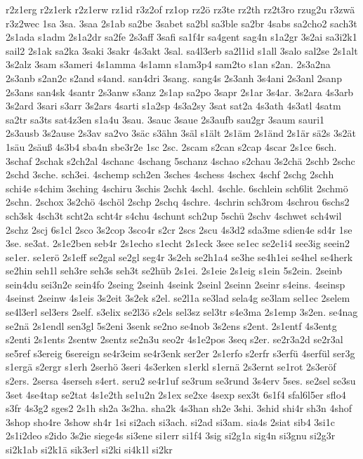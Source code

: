 {r2z1erg
r2z1erk
r2z1erw
rz1id
r3z2of
rz1op
rz2ö
rz3te
rz2th
rz2t3ro
rzug2u
r3zwä
r3z2wec
1sa
3sa.
3saa
2s1ab
sa2be
3sabet
sa2bl
sa3ble
sa2br
4sabs
sa2cho2
sach3t
2s1ada
s1adm
2s1a2dr
sa2fe
2s3aff
3safi
sa1f4r
sa4gent
sag4n
s1a2gr
3s2ai
sa3i2k1
sail2
2s1ak
sa2ka
3saki
3sakr
4s3akt
3sal.
sa4l3erb
sa2l1id
s1all
3salo
sal2se
2s1alt
3s2alz
3sam
s3ameri
4s1amma
4s1amn
s1am3p4
sam2to
s1an
s2an.
2s3a2na
2s3anb
s2an2c
s2and
s4and.
san4dri
3sang.
sang4s
2s3anh
3s4ani
2s3anl
2sanp
2s3ans
san4sk
4santr
2s3anw
s3anz
2s1ap
sa2po
3sapr
2s1ar
3s4ar.
3s2ara
4s3arb
3s2ard
3sari
s3arr
3s2ars
4sarti
s1a2sp
4s3a2sy
3sat
sat2a
4s3ath
4s3atl
4satm
sa2tr
sa3ts
sat4z3en
s1a4u
3sau.
3sauc
3saue
2s3aufb
sau2gr
3saum
sauri1
2s3ausb
3s2ause
2s3av
sa2vo
3säc
s3ähn
3säl
s1ält
2s1äm
2s1änd
2s1är
sä2s
3s2ät
1säu
2säuß
4s3b4
sba4n
sbe3r2e
1sc
2sc.
2scam
s2can
s2cap
4scar
2s1ce
6sch.
3schaf
2schak
s2ch2al
4schanc
4schang
5schanz
4schao
s2chau
3s2chä
2schb
2schc
2schd
3sche.
sch3ei.
4schemp
sch2en
3sches
4schess
4schex
4schf
2schg
2schh
schi4e
s4chim
3sching
4schiru
3schis
2schk
4schl.
4schle.
6schlein
sch6lit
2schmö
2schn.
2schox
3s2chö
4schöl
2schp
2schq
4schre.
4schrin
sch3rom
4schrou
6schs2
sch3sk
4sch3t
scht2a
scht4r
s4chu
4schunt
sch2up
5schü
2schv
4schwet
sch4wil
2schz
2scj
6s1cl
2sco
3s2cop
3sco4r
s2cr
2scs
2scu
4s3d2
sda3me
sdien4e
sd4r
1se
3se.
se3at.
2s1e2ben
seb4r
2s1echo
s1echt
2s1eck
3see
se1ec
se2e1i4
see3ig
seein2
se1er.
se1erö
2s1eff
se2gal
se2gl
seg4r
3s2eh
se2h1a4
se3he
se4h1ei
se4hel
se4herk
se2hin
seh1l
seh3re
seh3s
seh3t
se2hüb
2s1ei.
2s1eie
2s1eig
s1ein
5s2ein.
2seinb
sein4du
sei3n2e
sein4fo
2seing
2seinh
4seink
2seinl
2seinn
2seinr
s4eins.
4seinsp
4seinst
2seinw
4s1eis
3s2eit
3s2ek
s2el.
se2l1a
se3lad
sela4g
se3lam
sel1ec
2selem
se4l3erl
sel3ers
2self.
s3elix
se2l3ö
s2els
sel3sz
sel3tr
s4e3ma
2s1emp
3s2en.
se4nag
se2nä
2s1endl
sen3gl
5s2eni
3senk
se2no
se4nob
3s2ens
s2ent.
2s1entf
4s3entg
s2enti
2s1ents
2sentw
2sentz
se2n3u
seo2r
4s1e2pos
3seq
s2er.
se2r3a2d
se2r3al
se5ref
s3ereig
6sereign
se4r3eim
se4r3enk
ser2er
2s1erfo
s2erfr
s3erfü
4serfül
ser3g
s1ergä
s2ergr
s1erh
2serhö
3seri
4s3erken
s1erkl
s1ernä
2s3ernt
se1rot
2s3eröf
s2ers.
2sersa
4serseh
s4ert.
seru2
se4r1uf
se3rum
se3rund
3s4erv
5ses.
se2sel
se3su
3set
4se4tap
se2tat
4s1e2th
se1u2n
2s1ex
se2xe
4sexp
sex3t
6s1f4
sfal6l5er
sflo4
s3fr
4s3g2
sges2
2s1h
sh2a
3s2ha.
sha2k
4s3han
sh2e
3shi.
3shid
shi4r
sh3n
4shof
3shop
sho4re
3show
sh4r
1si
si2ach
si3ach.
si2ad
si3am.
sia4s
2siat
sib4
3si1c
2s1i2deo
s2ido
3s2ie
siege4s
si3ene
si1err
si1f4
3sig
si2g1a
sig4n
si3gnu
si2g3r
si2k1ab
si2k1ä
sik3erl
si2ki
si4k1l
si2kr
}
